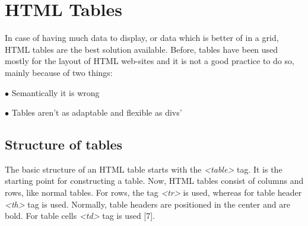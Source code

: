 %
%
% 
% 
% 


\chapter{HTML Tables}

\label{HTML5 Tables}

In case of having much data to display, or data which is better of in a grid, HTML tables
are the best solution available. Before, tables have been used mostly for the layout of 
HTML web-sites and it is not a good practice to do so, mainly because of two things:
 

$\bullet$ Semantically it is wrong

$\bullet$ Tables aren't as adaptable and flexible as divs'

\section{Structure of tables}

The basic structure of an HTML table starts with the \textit{<table>} tag. It is the starting
point for constructing a table. Now, HTML tables consist of columns and rows, like normal
tables. For rows, the tag  \textit{<tr>} is used, whereas for table header \textit{<th>} tag
is used. Normally, table headers are positioned in the center and are bold. For table cells
\textit{<td>} tag is used [7]. 

